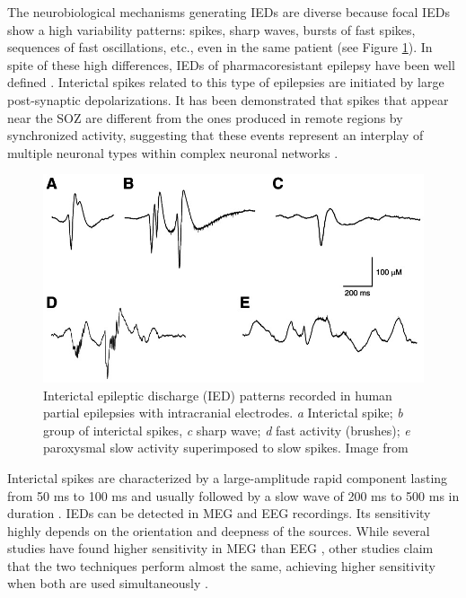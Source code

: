 The neurobiological mechanisms generating IEDs are diverse because focal IEDs show a high variability patterns: spikes, sharp waves, bursts of fast spikes, sequences of fast oscillations, etc., even in the same patient (see Figure \ref{fig:iedtype}). In spite of these high differences, IEDs of pharmacoresistant epilepsy have been well defined \citep{deCurtis2012}. Interictal spikes related to this type of epilepsies are initiated by large post-synaptic depolarizations. It has been demonstrated that spikes that appear near the SOZ are different from the ones produced in remote regions by synchronized activity, suggesting that these events represent an interplay of multiple neuronal types within complex neuronal networks \citep{Keller2010}. 


\begin{figure}[ht]
\centering
\includegraphics[width=1\textwidth]{Images/decurtisf1.jpg}
\caption{Interictal epileptic discharge (IED) patterns recorded in human partial epilepsies with intracranial electrodes. \emph{a} Interictal spike; \emph{b} group of interictal spikes, \emph{c} sharp wave; \emph{d} fast activity (brushes); \emph{e} paroxysmal slow activity superimposed to slow spikes. Image from \citep{deCurtis2012}}
\label{fig:iedtype}
\end{figure}      

Interictal spikes are characterized by a large-amplitude rapid component lasting from 50 ms to 100 ms and usually followed by a slow wave of 200 ms to 500 ms in duration \citep{Nowak2009}. IEDs can be detected in MEG and EEG recordings. Its sensitivity highly depends on the orientation and deepness of the sources. While several studies have found higher sensitivity in MEG than EEG \citep{Ramantani2006,Zijlmans2002,Iwasaki2003}, other studies claim that the two techniques perform almost the same, achieving higher sensitivity when both are used simultaneously \citep{Baumgartner2004}.

